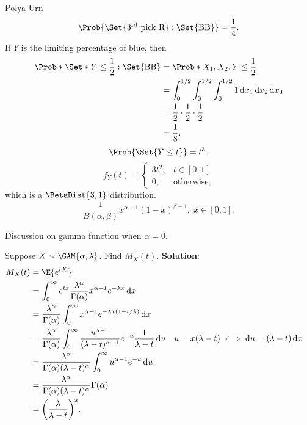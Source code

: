 \begin{Example}{Polya Urn}{}
    \[ \Prob{\Set{3\textsuperscript{rd}\text{ pick R}}\given \Set{\text{BB}}}
        =\frac{1}{4}. \]
    If $ Y $ is the limiting percentage of blue, then
    \begin{align*}
        \Prob*{\Set*{Y\le \frac{1}{2}}\given \Set{\text{BB}}}
         & =\Prob*{X_1,X_2,Y\le \frac{1}{2}}                                          \\
         & =\int_{0}^{1/2}\int_{0}^{1/2}\int_{0}^{1/2}1\odif{x_1}\odif{x_2}\odif{x_3} \\
         & =\frac{1}{2}\cdot \frac{1}{2}\cdot \frac{1}{2}                             \\
         & =\frac{1}{8}.
    \end{align*}
    \[ \Prob{\Set{Y\le t}}=t^3. \]
    \[ f_Y(t)=\begin{cases}
            3t^2, & t\in[0,1]         \\
            0,    & \text{otherwise},
        \end{cases} \]
    which is a $ \BetaDist{3,1} $ distribution.
    \[ \frac{1}{B(\alpha,\beta)}x^{\alpha-1}(1-x)^{\beta-1},\; x\in[0,1]. \]
\end{Example}
Discussion on gamma function when $ \alpha=0 $.
\begin{Example}{}{}
    Suppose $ X \sim \GAM{\alpha,\lambda} $. Find
    $ M_X(t) $.
    \tcblower{}
    \textbf{Solution}:
    \begin{align*}
        M_X(t)
         & =\E{e^{tX}}                                                                                                                                                                               \\
         & =\int_{0}^{\infty}e^{tx}\frac{\lambda^\alpha}{\Gamma(\alpha)}x^{\alpha-1}e^{-\lambda x}\odif{x}                                                                                           \\
         & =\frac{\lambda^\alpha}{\Gamma(\alpha)}\int_{0}^{\infty}x^{\alpha-1}e^{-\lambda x(1-t/\lambda)}\odif{x}                                                                                    \\
         & =\frac{\lambda^\alpha}{\Gamma(\alpha)}\int_{0}^{\infty}\frac{u^{\alpha -1}}{(\lambda-t)^{\alpha-1}}e^{-u}\frac{1}{\lambda-t}\odif{u} &  & u=x(\lambda-t)\iff \odif{u}=(\lambda-t)\odif{x} \\
         & =\frac{\lambda^\alpha}{\Gamma(\alpha)(\lambda-t)^{\alpha}}\int_{0}^{\infty}u^{\alpha-1}e^{-u}\odif{u}                                                                                     \\
         & =\frac{\lambda^\alpha}{\Gamma(\alpha)(\lambda-t)^{\alpha}}\Gamma(\alpha)                                                                                                                  \\
         & =\biggl(\frac{\lambda}{\lambda-t}\biggr)^{\! \alpha}.
    \end{align*}
\end{Example}
